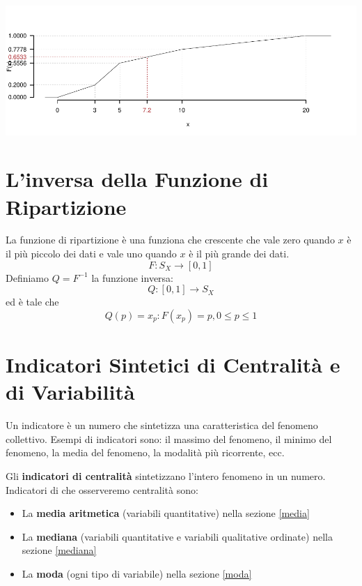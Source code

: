 \documentclass[
  11pt,
]{book}
\providecommand{\tightlist}{%
  \setlength{\itemsep}{0pt}\setlength{\parskip}{0pt}}
\theoremstyle{mytheoremstyle}
\theoremstyle{mydefstyle}
\begin{document}
\begin{center}\includegraphics{Appunti_di_Statistica_2025_files/figure-latex/plot FdR-1} \end{center}

\section{L'inversa della Funzione di Ripartizione}\label{linversa-della-funzione-di-ripartizione}

La funzione di ripartizione è una funziona che crescente che vale zero quando
\(x\) è il più piccolo dei dati e vale uno quando \(x\) è il più grande dei dati.
\[
F:S_X\to [0,1]
\]
Definiamo \(Q=F^{-1}\) la funzione inversa:
\[
Q:[0,1]\to S_X
\]
ed è tale che
\[
Q(p)=x_p:F(x_p)=p, 0\le p\le 1
\]

\section{Indicatori Sintetici di Centralità e di Variabilità}\label{indicatori-sintetici-di-centralituxe0-e-di-variabilituxe0}

Un indicatore è un numero che sintetizza una caratteristica del fenomeno collettivo.
Esempi di indicatori sono: il massimo del fenomeno, il minimo del fenomeno, la media del fenomeno,
la modalità più ricorrente, ecc.

Gli \textbf{indicatori di centralità} sintetizzano l'intero fenomeno in un numero. Indicatori di che osserveremo centralità sono:

\begin{itemize}
\tightlist
\item
  La \textbf{media aritmetica} (variabili quantitative) nella sezione \ref{media}
\item
  La \textbf{mediana} (variabili quantitative e variabili qualitative ordinate) nella sezione \ref{mediana}
\item
  La \textbf{moda} (ogni tipo di variabile) nella sezione \ref{moda}
\end{itemize}
\end{document}
